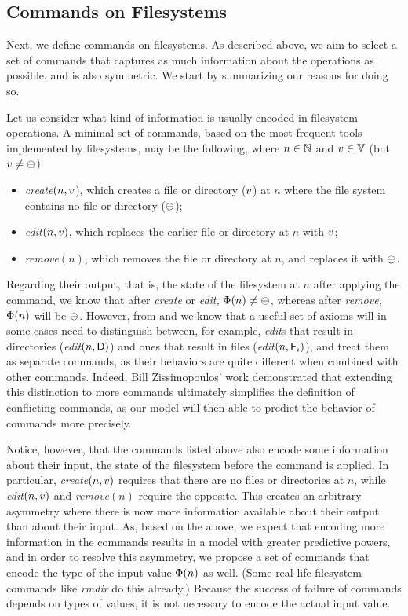 
\subsection{Commands on Filesystems}

Next, we define commands on filesystems.
As described above, we aim to select a set of commands
that captures as much information
about the operations as possible, and is also symmetric.
We start by summarizing our reasons for doing so.


Let us consider what kind of information is usually encoded in filesystem operations.
A minimal set of commands, based on the most frequent tools implemented by filesystems,
may be the following, where 
$n\in\mathbb{N}$ and $v\in\mathbb{V}$ (but $v\neq\ominus$):
\begin{itemize}
\item \textit{create}$(n,v$), which creates a file or directory ($v$) at $n$
where the file system contains no file or directory ($\ominus$);
\item \textit{edit}$(n,v)$, which replaces the earlier file or directory at $n$ with $v$;
\item \textit{remove}$(n)$, which removes the file or directory at $n$, and replaces it with $\ominus$.
\end{itemize}
Regarding their output, that is, the state of the filesystem at $n$
after applying the command,
we know that after \textit{create} or \textit{edit,} $\Phi(n)\neq\ominus$, whereas after \textit{remove,}
$\Phi(n)$ will be $\ominus$. 
However, from \cite{NREC} and \cite{CBNR} we know that a useful set of axioms
will in some cases need to distinguish between, for example,
\textit{edit}s that result in directories (\textit{edit}$(n,\mathsf{D})$) and
ones that result in files (\textit{edit}$(n,\mathsf{F}_i)$), and treat them as separate commands,
as their behaviors are quite different when combined with other commands.
Indeed, Bill Zissimopoulos' work
demonstrated \cite{BZ}
that extending this distinction to more commands ultimately simplifies
the definition of conflicting commands, as our model will then able to predict the behavior of commands
more precisely.

Notice, however, that the commands listed above also encode some information about 
their input, the state of the filesystem
before the command is applied. In particular, \textit{create}$(n,v)$ requires that there are no files
or directories at $n$, while \textit{edit}$(n,v)$ and \textit{remove}$(n)$ require the opposite.
This creates an arbitrary asymmetry where
there is now more information available about their output than about their input.
As, based on the above, we expect that encoding more information in the commands
results in a model with greater predictive powers,
and in order to resolve this asymmetry, 
we propose a set of commands that encode
the type of the input value $\Phi(n)$ as well.
(Some real-life filesystem commands like \textit{rmdir} do this already.)
Because the success of failure of commands depends on types of values,
it is not necessary to encode the actual input value.

